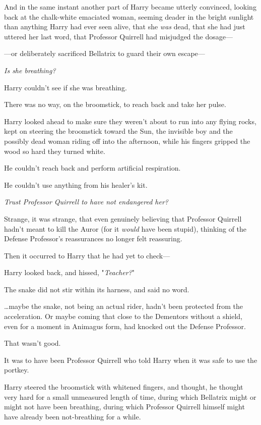 And in the same instant another part of Harry became utterly convinced, looking 
back at the chalk-white emaciated woman, seeming deader in the bright sunlight 
than anything Harry had ever seen alive, that she \emph{was} dead, that she had 
just uttered her last word, that Professor Quirrell had misjudged the dosage---

---or deliberately sacrificed Bellatrix to guard their own escape---

\emph{Is she breathing?}

Harry couldn't see if she was breathing.

There was no way, on the broomstick, to reach back and take her pulse.

Harry looked ahead to make sure they weren't about to run into any flying 
rocks, kept on steering the broomstick toward the Sun, the invisible boy and 
the possibly dead woman riding off into the afternoon, while his fingers 
gripped the wood so hard they turned white.

He couldn't reach back and perform artificial respiration.

He couldn't use anything from his healer's kit.

\emph{Trust Professor Quirrell to have not endangered her?}

Strange, it was strange, that even genuinely believing that Professor Quirrell 
hadn't meant to kill the Auror (for it \emph{would} have been stupid), thinking 
of the Defense Professor's reassurances no longer felt reassuring.

Then it occurred to Harry that he had yet to check---

Harry looked back, and hissed, "\emph{Teacher?}"

The snake did not stir within its harness, and said no word.

{\ldots}maybe the snake, not being an actual rider, hadn't been protected from 
the acceleration. Or maybe coming that close to the Dementors without a shield, 
even for a moment in Animagus form, had knocked out the Defense Professor.

That wasn't good.

It was to have been Professor Quirrell who told Harry when it was safe to use 
the portkey.

Harry steered the broomstick with whitened fingers, and thought, he thought 
very hard for a small unmeasured length of time, during which Bellatrix might 
or might not have been breathing, during which Professor Quirrell himself might 
have already been not-breathing for a while.

